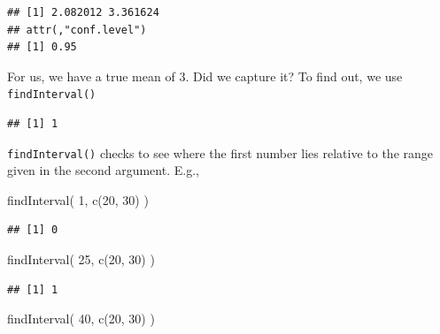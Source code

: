 \documentclass[
]{book}
\newenvironment{Shaded}{\begin{snugshade}}{\end{snugshade}}
\newcommand{\DecValTok}[1]{\textcolor[rgb]{0.00,0.00,0.81}{#1}}
\newcommand{\FunctionTok}[1]{\textcolor[rgb]{0.00,0.00,0.00}{#1}}
\newcommand{\NormalTok}[1]{#1}
\newcommand{\SpecialCharTok}[1]{\textcolor[rgb]{0.00,0.00,0.00}{#1}}
\begin{document}
\begin{verbatim}
## [1] 2.082012 3.361624
## attr(,"conf.level")
## [1] 0.95
\end{verbatim}

For us, we have a true mean of 3. Did we capture it? To find out, we use \texttt{findInterval()}

\begin{Shaded}
\end{Shaded}

\begin{verbatim}
## [1] 1
\end{verbatim}

\texttt{findInterval()} checks to see where the first number lies relative to the
range given in the second argument. E.g.,

\begin{Shaded}
\begin{Highlighting}[]
\FunctionTok{findInterval}\NormalTok{( }\DecValTok{1}\NormalTok{, }\FunctionTok{c}\NormalTok{(}\DecValTok{20}\NormalTok{, }\DecValTok{30}\NormalTok{) )}
\end{Highlighting}
\end{Shaded}

\begin{verbatim}
## [1] 0
\end{verbatim}

\begin{Shaded}
\begin{Highlighting}[]
\FunctionTok{findInterval}\NormalTok{( }\DecValTok{25}\NormalTok{, }\FunctionTok{c}\NormalTok{(}\DecValTok{20}\NormalTok{, }\DecValTok{30}\NormalTok{) )}
\end{Highlighting}
\end{Shaded}

\begin{verbatim}
## [1] 1
\end{verbatim}

\begin{Shaded}
\begin{Highlighting}[]
\FunctionTok{findInterval}\NormalTok{( }\DecValTok{40}\NormalTok{, }\FunctionTok{c}\NormalTok{(}\DecValTok{20}\NormalTok{, }\DecValTok{30}\NormalTok{) )}
\end{Highlighting}
\end{Shaded}
\end{document}
